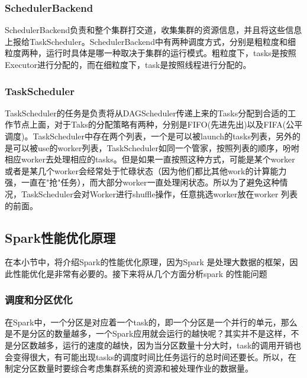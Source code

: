 \subsubsection{SchedulerBackend}
SchedulerBackend负责和整个集群打交道，收集集群的资源信息，并且将这些信息上报给TaskScheduler。SchedulerBackend中有两种调度方式，分别是粗粒度和细粒度两种，运行时具体是哪一种取决于集群的运行模式。粗粒度下，tasks是按照Executor进行分配的，而在细粒度下，task是按照线程进行分配的。
\subsubsection{TaskScheduler}
TaskScheduler的任务是负责将从DAGScheduler传递上来的Tasks分配到合适的工作节点上面，对于Taks的分配策略有两种，分别是FIFO(先进先出)以及FIFA(公平调度)。TaskScheduler中存在两个列表，一个是可以被launch的tasks列表，另外的是可以被use的worker列表，TaskScheduler如同一个管家，按照列表的顺序，吩咐相应worker去处理相应的tasks。但是如果一直按照这种方式，可能是某个worker或者是某几个worker会经常处于忙碌状态（因为他们都比其他work的计算能力强，一直在"抢"任务），而大部分worker一直处理闲状态。所以为了避免这种情况，TaskScheduler会对Worker进行shuffle操作，任意挑选worker放在worker 列表的前面。

\subsection{Spark性能优化原理}
在本小节中，将介绍Spark的性能优化原理，因为Spark 是处理大数据的框架，因此性能优化是非常有必要的。接下来将从几个方面分析spark 的性能问题
\subsubsection{调度和分区优化}
在Spark中，一个分区是对应着一个task的，即一个分区是一个并行的单元，那么是不是分区的数量越多，一个Spark应用就会运行的越快呢？其实并不是这样，不是分区数越多，运行的速度的越快，因为当分区数量十分大时，task的调用开销也会变得很大，有可能出现tasks的调度时间比任务运行的总时间还要长。所以，在制定分区数量时要综合考虑集群系统的资源和被处理作业的数据量。

